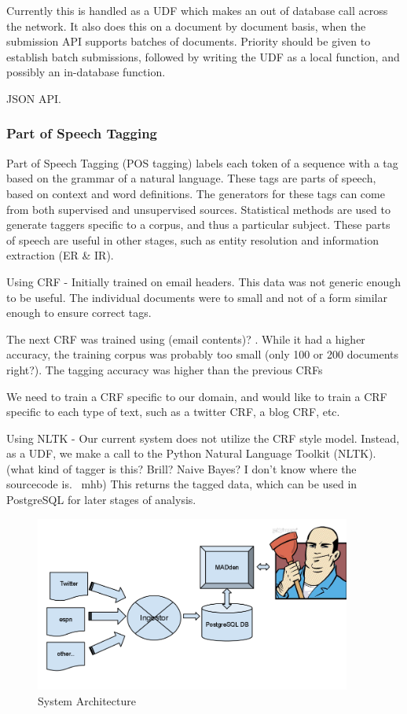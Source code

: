 \documentclass{article}
\begin{document}
\begin{enumerate}
    Currently this is handled as a UDF which makes an out of database call across the network.
    It also does this on a document by document basis,
    when the submission API supports batches of documents.
    Priority should be given to establish batch submissions,
    followed by writing the UDF as a local function,
    and possibly an in-database function.

    JSON API.

    \subsubsection{Part of Speech Tagging}

    Part of Speech Tagging (POS tagging) labels each token of a sequence with a tag based on the grammar of a natural language.
    These tags are parts of speech, based on context and word definitions.
    The generators for these tags can come from both supervised and unsupervised sources.
    Statistical methods are used to generate taggers specific to a corpus, and thus a particular subject.
    These parts of speech are useful in other stages, such as entity resolution and information extraction (ER \& IR).

    Using CRF -
    Initially trained on email headers.
    This data was not generic enough to be useful.
    The individual documents were to small and not of a form similar enough to ensure correct tags.

    The next CRF was trained using (email contents)? .
    While it had a higher accuracy, the training corpus was probably too small (only 100 or 200 documents right?).
    The tagging accuracy was higher than the previous CRFs

    We need to train a CRF specific to our domain,
    and would like to train a CRF specific to each type of text,
    such as a twitter CRF, a blog CRF, etc.

    Using NLTK -
    Our current system does not utilize the CRF style model.
    Instead, as a UDF, we make a call to the Python Natural Language Toolkit (NLTK).
    (what kind of tagger is this? Brill? Naive Bayes? I don't know where the sourcecode is. ~mhb)
    This returns the tagged data, which can be used in PostgreSQL for later stages of analysis.

  \begin{figure}
    \begin{center}
      \includegraphics[width=104mm]{architecture-1.png}
      \caption{System Architecture}
      \label{fig:architecture}
    \end{center}
  \end{figure}


\end{enumerate}
\end{document}
